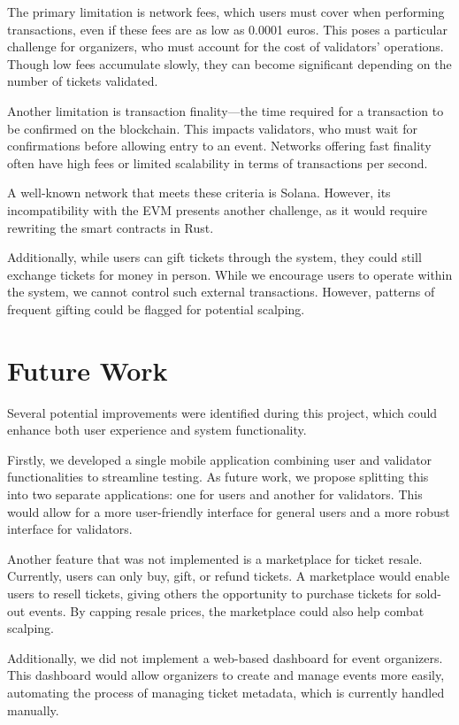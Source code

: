 The primary limitation is network fees, which users must cover when performing
transactions, even if these fees are as low as 0.0001 euros. This poses a
particular challenge for organizers, who must account for the cost of
validators' operations. Though low fees accumulate slowly, they can become
significant depending on the number of tickets validated.

Another limitation is transaction finality—the time required for a transaction
to be confirmed on the blockchain. This impacts validators, who must wait for
confirmations before allowing entry to an event. Networks offering fast
finality often have high fees or limited scalability in terms of transactions
per second.

A well-known network that meets these criteria is Solana. However, its
incompatibility with the EVM presents another challenge, as it would require
rewriting the smart contracts in Rust.

Additionally, while users can gift tickets through the system, they could still
exchange tickets for money in person. While we encourage users to operate
within the system, we cannot control such external transactions. However,
patterns of frequent gifting could be flagged for potential scalping.

\section{Future Work}\label{sec:future_work}

Several potential improvements were identified during this project, which could
enhance both user experience and system functionality.

Firstly, we developed a single mobile application combining user and validator
functionalities to streamline testing. As future work, we propose splitting
this into two separate applications: one for users and another for validators.
This would allow for a more user-friendly interface for general users and a
more robust interface for validators.

Another feature that was not implemented is a marketplace for ticket resale.
Currently, users can only buy, gift, or refund tickets. A marketplace would
enable users to resell tickets, giving others the opportunity to purchase
tickets for sold-out events. By capping resale prices, the marketplace could
also help combat scalping.

Additionally, we did not implement a web-based dashboard for event organizers.
This dashboard would allow organizers to create and manage events more easily,
automating the process of managing ticket metadata, which is currently handled
manually.

